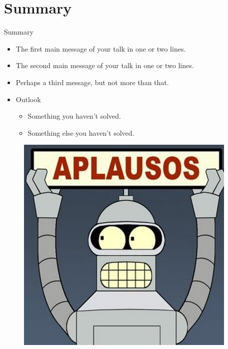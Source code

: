\documentclass{beamer}
\begin{document}
\section*{Summary}

\begin{frame}{Summary}
  \begin{itemize}
  \item
    The \alert{first main message} of your talk in one or two lines.
  \item
    The \alert{second main message} of your talk in one or two lines.
  \item
    Perhaps a \alert{third message}, but not more than that.
  \end{itemize}
  
  \begin{itemize}
  \item
    Outlook
    \begin{itemize}
    \item
      Something you haven't solved.
    \item
      Something else you haven't solved.
    \end{itemize}
  \end{itemize}
\end{frame}

\begin{frame}
\begin{figure}[h]
 \centering
  \begin{minipage}[c]{1\textwidth}
	\centering	
	\includegraphics[scale=0.4]{bender.jpg}
  \end{minipage}
\end{figure}
\end{frame}
\end{document}
